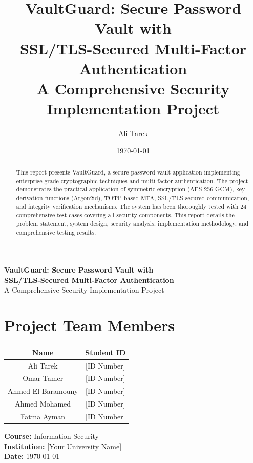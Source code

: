 \documentclass[12pt,a4paper]{report}
\title{\textbf{VaultGuard: Secure Password Vault with\\SSL/TLS-Secured Multi-Factor Authentication}\\
\vspace{0.5cm}
\large{A Comprehensive Security Implementation Project}}
\author{Ali Tarek}
\date{\today}
\begin{document}
\begin{titlepage}
\centering
\vspace*{2cm}

\textbf{\LARGE VaultGuard: Secure Password Vault with\\SSL/TLS-Secured Multi-Factor Authentication}\\
\vspace{0.5cm}
{\large A Comprehensive Security Implementation Project}

\vspace{2cm}

\section*{Project Team Members}

\begin{table}[H]
\centering
\begin{tabular}{|c|c|}
\hline
\textbf{Name} & \textbf{Student ID} \\
\hline
Ali Tarek & [ID Number] \\
\hline
Omar Tamer & [ID Number] \\
\hline
Ahmed El-Baramouny & [ID Number] \\
\hline
Ahmed Mohamed & [ID Number] \\
\hline
Fatma Ayman & [ID Number] \\
\hline
\end{tabular}
\end{table}

\vspace{2cm}

\textbf{Course:} Information Security\\
\textbf{Institution:} [Your University Name]\\
\textbf{Date:} \today

\vfill

\end{titlepage}

\newpage

\begin{abstract}
This report presents VaultGuard, a secure password vault application implementing enterprise-grade cryptographic techniques and multi-factor authentication. The project demonstrates the practical application of symmetric encryption (AES-256-GCM), key derivation functions (Argon2id), TOTP-based MFA, SSL/TLS secured communication, and integrity verification mechanisms. The system has been thoroughly tested with 24 comprehensive test cases covering all security components. This report details the problem statement, system design, security analysis, implementation methodology, and comprehensive testing results.
\end{abstract}
\end{document}
